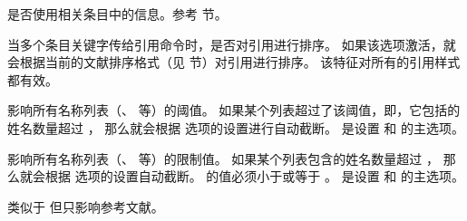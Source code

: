 \begin{optionlist}

是否使用相关条目中的信息。参考  节。



当多个条目关键字传给引用命令时，是否对引用进行排序。
如果该选项激活，就会根据当前的文献排序格式（见  节）对引用进行排序。
该特征对所有的引用样式都有效。



影响所有名称列表（、 等）的阈值。
如果某个列表超过了该阈值，即，它包括的姓名数量超过 ，
那么就会根据  选项的设置进行自动截断。
 是设置  和  的主选项。



影响所有名称列表（、 等）的限制值。
如果某个列表包含的姓名数量超过 ，
那么就会根据  选项的设置自动截断。
 的值必须小于或等于 。
 是设置  和  的主选项。



类似于  但只影响参考文献。


\end{optionlist}
